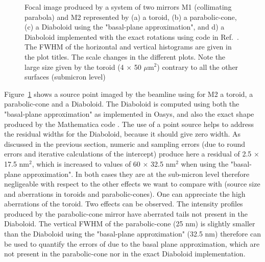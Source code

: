 \documentclass{iucr}              %
\begin{document}
\begin{figure}[h]
\caption{\label{fig:bl}Focal image produced by a system of two mirrors M1 (collimating parabola) and M2 represented by (a) a toroid, (b) a parabolic-cone, (c) a Diaboloid using the "basal-plane approximation", and d) a Diaboloid implemented with the exact rotations using code in Ref.~\cite{lacey}. The FWHM of the horizontal and vertical histograms are given in the plot titles. The scale changes in the different plots. Note the large size given by the toroid (4 $\times$ 50 $\mu$m$^2$) contrary to all the other surfaces (submicron level)
}
\end{figure}

Figure~\ref{fig:bl} shows a source point imaged by the beamline using for M2 a toroid, a parabolic-cone and a Diaboloid. The Diaboloid is computed using both the "basal-plane approximation" as implemented in Oasys, and also the exact shape produced by the Mathematica code \cite{lacey}. The use of a point source helps to address the residual widths for the Diaboloid, because it should give zero width. As discussed in the previous section, numeric and sampling errors (due to round errors and iterative calculations of the intercept) produce here a residual of 2.5 $\times$ 17.5 nm$^2$, which is increased to values of 60 $\times$ 32.5 nm$^2$ when using the "basal-plane approximation". In both cases they are at the sub-micron level therefore negligeable with respect to the other effects we want to compare with (source size and aberrations in toroids and parabolic-cones). One can appreciate the high aberrations of the toroid. Two effects can be observed. The intensity profiles produced by the parabolic-cone mirror have aberrated tails not present in the Diaboloid. The vertical FWHM of the parabolic-cone (25 nm) is slightly smaller than the Diaboloid using the "basal-plane approximation" (32.5 nm) therefore can be used to quantify the errors of due to the basal plane approximation, which are not present in the parabolic-cone nor in the exact Diaboloid implementation. 
\end{document}
